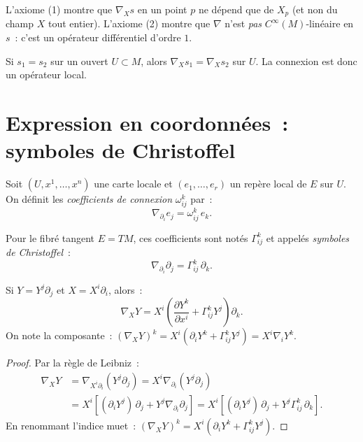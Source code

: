 \begin{remarque}
L'axiome (1) montre que $\nabla_X s$ en un point $p$ ne d\'epend que de $X_p$
(et non du champ $X$ tout entier). L'axiome (2) montre que $\nabla$ n'est
\emph{pas} $C^\infty(M)$-lin\'eaire en $s$~: c'est un op\'erateur diff\'erentiel
d'ordre $1$.
\end{remarque}

\begin{proposition}[Localit\'e]
Si $s_1 = s_2$ sur un ouvert $U \subset M$, alors $\nabla_X s_1 = \nabla_X s_2$
sur $U$. La connexion est donc un op\'erateur local.
\end{proposition}

\section{Expression en coordonn\'ees~: symboles de Christoffel}

Soit $(U, x^1, \ldots, x^n)$ une carte locale et $(e_1, \ldots, e_r)$ un rep\`ere
local de $E$ sur $U$. On d\'efinit les \emph{coefficients de connexion}
$\omega^k_{ij}$ par~:
\[
    \nabla_{\partial_i} e_j = \omega^k_{ij}\, e_k.
\]

Pour le fibr\'e tangent $E = TM$, ces coefficients sont not\'es $\Gamma^k_{ij}$
et appel\'es \emph{symboles de Christoffel}~:
\[
    \nabla_{\partial_i} \partial_j = \Gamma^k_{ij}\, \partial_k.
\]

\begin{proposition}
Si $Y = Y^j \partial_j$ et $X = X^i \partial_i$, alors~:
\[
    \nabla_X Y = X^i \left(\frac{\partial Y^k}{\partial x^i} + \Gamma^k_{ij} Y^j\right) \partial_k.
\]
On note la composante~: $(\nabla_X Y)^k = X^i (\partial_i Y^k + \Gamma^k_{ij} Y^j)
= X^i \nabla_i Y^k$.
\end{proposition}

\begin{proof}
Par la r\`egle de Leibniz~:
\begin{align*}
    \nabla_X Y &= \nabla_{X^i \partial_i}(Y^j \partial_j)
    = X^i \nabla_{\partial_i}(Y^j \partial_j) \\
    &= X^i \left[(\partial_i Y^j)\, \partial_j + Y^j \nabla_{\partial_i}\partial_j\right]
    = X^i \left[(\partial_i Y^j)\, \partial_j + Y^j \Gamma^k_{ij}\, \partial_k\right].
\end{align*}
En renommant l'indice muet~: $(\nabla_X Y)^k = X^i(\partial_i Y^k + \Gamma^k_{ij} Y^j)$.
\end{proof}

